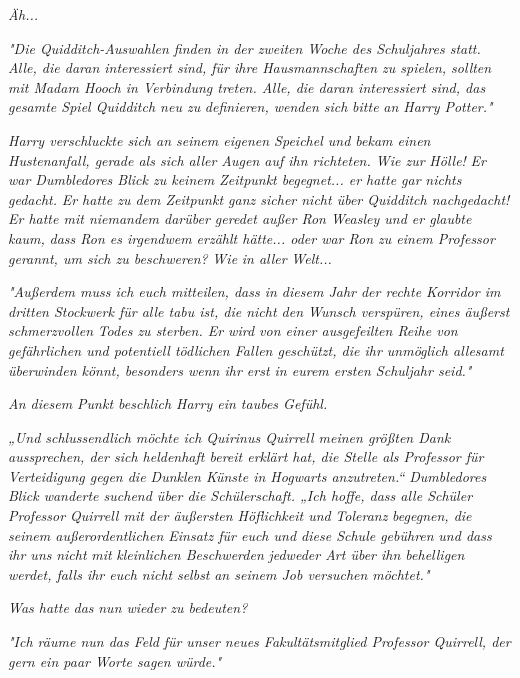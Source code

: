{\emph{Äh...}

\emph{"Die Quidditch-Auswahlen finden in der zweiten Woche des Schuljahres statt. Alle, die daran interessiert sind, für ihre Hausmannschaften zu spielen, sollten mit Madam Hooch in Verbindung treten. Alle, die daran interessiert sind, das gesamte Spiel Quidditch neu zu} \emph{definieren, wenden sich} \emph{bitte} \emph{an Harry Potter."}

\emph{Harry verschluckte sich an seinem eigenen Speichel und bekam einen Hustenanfall, gerade als sich aller Augen auf ihn richteten. Wie zur} \emph{\emph{Hölle!}} \emph{Er war Dumbledores Blick zu keinem Zeitpunkt begegnet... er hatte gar} \emph{nichts} \emph{\emph{gedacht.}} \emph{Er hatte zu dem Zeitpunkt ganz sicher nicht über Quidditch nachgedacht! Er hatte mit niemandem darüber geredet außer Ron Weasley und er glaubte} \emph{\emph{kaum,}} \emph{dass Ron es irgendwem erzählt hätte... oder war Ron zu einem Professor gerannt, um sich zu beschweren?} \emph{\emph{Wie}} \emph{in aller} \emph{\emph{Welt...}}

\emph{"Außerdem muss ich euch mitteilen, dass in diesem Jahr der rechte Korridor im dritten Stockwerk für alle tabu ist, die nicht den Wunsch verspüren, eines äußerst schmerzvollen} \emph{Todes zu sterben. Er wird von einer ausgefeilten Reihe von gefährlichen und potentiell tödlichen Fallen geschützt, die ihr unmöglich allesamt} \emph{überwinden könnt, besonders wenn ihr erst in eurem ersten Schuljahr seid."}

\emph{An diesem Punkt beschlich Harry ein taubes Gefühl.}

\emph{„Und schlussendlich möchte ich Quirinus Quirrell meinen größten Dank aussprechen, der sich heldenhaft bereit erklärt hat, die Stelle als Professor für Verteidigung gegen die Dunklen Künste in Hogwarts anzutreten.“ Dumbledores} \emph{Blick wanderte suchend über die Schülerschaft. „Ich hoffe, dass alle Schüler Professor Quirrell mit der äußersten Höflichkeit und} \emph{\emph{Toleranz}} \emph{begegnen, die seinem außerordentlichen Einsatz für euch und diese Schule gebühren} \emph{und dass ihr uns} \emph{\emph{nicht}} \emph{mit} \emph{\emph{kleinlichen Beschwerden}} \emph{jedweder Art über ihn behelligen werdet, falls ihr euch nicht} \emph{\emph{selbst}} \emph{an seinem Job versuchen möchtet."}

\emph{Was hatte} \emph{\emph{das}} \emph{nun wieder zu bedeuten?}

\emph{"Ich räume nun das Feld} \emph{für unser neues Fakultätsmitglied Professor Quirrell, der gern ein paar Worte sagen würde."}

}
